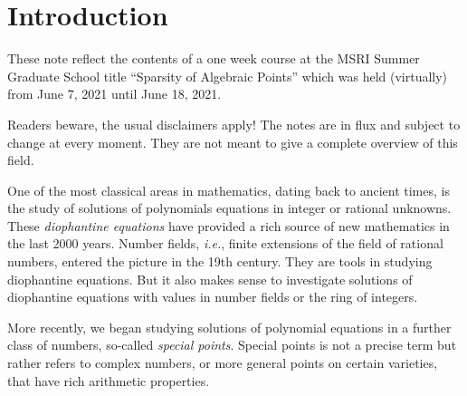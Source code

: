 \chapter{Introduction}

These note reflect the contents of a one week course at the MSRI
Summer Graduate School title ``Sparsity of Algebraic Points'' which
was held (virtually) from June 7, 2021 until June 18, 2021.

Readers beware, the usual disclaimers apply! The notes are in flux and
subject to change at every moment. They are not meant to give a
complete overview of this field.

One of the most classical areas in mathematics, dating back to ancient
times, is the study of solutions of polynomials equations in integer
or rational unknowns. These \textit{diophantine equations} have
provided a rich source of new mathematics in the last 2000 years.
Number fields, \textit{i.e.}, finite extensions of the field of
rational numbers, entered the picture in the 19th century. They are
tools in studying diophantine equations. But it also makes sense to
investigate solutions of diophantine equations with values in number
fields or the ring of integers.

More recently, we began studying solutions of polynomial equations in
a further class of numbers, so-called \textit{special points}. Special
points is not a precise term but rather refers to complex numbers, or
more general points on certain varieties, that have rich arithmetic
properties.

